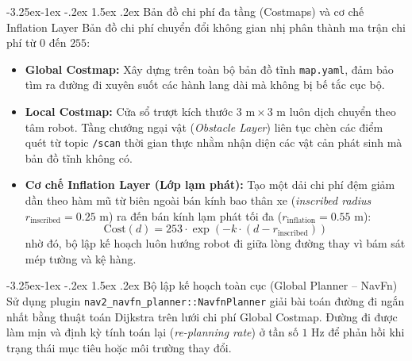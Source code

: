 \documentclass[11pt,a4paper]{article}
\makeatletter
\renewcommand{\subsection}{\@startsection{subsection}{2}{\z@}%
  {-3.25ex\@plus -1ex \@minus -.2ex}%
  {1.5ex \@plus .2ex}%
  {\normalfont\large\bfseries\color{secondary}}}
\makeatother
\begin{document}
\subsection{Bản đồ chi phí đa tầng (Costmaps) và cơ chế Inflation Layer}
Bản đồ chi phí chuyển đổi không gian nhị phân thành ma trận chi phí từ $0$ đến $255$:
\begin{itemize}
  \item \textbf{Global Costmap:} Xây dựng trên toàn bộ bản đồ tĩnh \texttt{map.yaml}, đảm bảo tìm ra đường đi xuyên suốt các hành lang dài mà không bị bế tắc cục bộ.
  \item \textbf{Local Costmap:} Cửa sổ trượt kích thước $3\text{ m} \times 3\text{ m}$ luôn dịch chuyển theo tâm robot. Tầng chướng ngại vật (\textit{Obstacle Layer}) liên tục chèn các điểm quét từ topic \texttt{/scan} thời gian thực nhằm nhận diện các vật cản phát sinh mà bản đồ tĩnh không có.
  \item \textbf{Cơ chế Inflation Layer (Lớp lạm phát):} Tạo một dải chi phí đệm giảm dần theo hàm mũ từ biên ngoài bán kính bao thân xe (\textit{inscribed radius} $r_{\text{inscribed}} = 0.25\text{ m}$) ra đến bán kính lạm phát tối đa ($r_{\text{inflation}} = 0.55\text{ m}$):
  \begin{equation}
    \text{Cost}(d) = 253 \cdot \exp\left( -k \cdot (d - r_{\text{inscribed}}) \right)
  \end{equation}
  nhờ đó, bộ lập kế hoạch luôn hướng robot đi giữa lòng đường thay vì bám sát mép tường và kệ hàng.
\end{itemize}

\subsection{Bộ lập kế hoạch toàn cục (Global Planner -- NavFn)}
Sử dụng plugin \texttt{nav2\_navfn\_planner::NavfnPlanner} giải bài toán đường đi ngắn nhất bằng thuật toán Dijkstra trên lưới chi phí Global Costmap. Đường đi được làm mịn và định kỳ tính toán lại (\textit{re-planning rate}) ở tần số $1\text{ Hz}$ để phản hồi khi trạng thái mục tiêu hoặc môi trường thay đổi.
\end{document}

